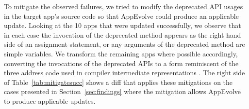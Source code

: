 To mitigate the observed failures, we tried to modify the deprecated API
usages in the target app's source code so that AppEvolve could produce an
applicable update. Looking at the 10 apps that were updated successfully,
we observe that in each case the invocation of the deprecated method
appears as the right hand side of an assignment statement, or any
arguments of the deprecated method are simple variables.
We transform the remaining apps where possible accordingly, converting the
invocations of the deprecated APIs to a form reminiscent of the three
address code used in compiler intermediate representations \cite{dragon}.
The right side of Table~\ref{tab:mitigatesucc} shows a diff that applies
these mitigations on the cases presented in Section~\ref{sec:findings}
where the mitigation allows AppEvolve to produce applicable updates.

